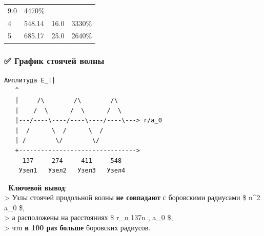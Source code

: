 \documentclass[11pt]{article}
\begin{document}
\begin{longtable}[]{@{}llll@{}}
\begin{minipage}[t]{0.29\columnwidth}
9.0\strut
\end{minipage} & \begin{minipage}[t]{0.22\columnwidth}\raggedright\strut
4470\%\strut
\end{minipage}\tabularnewline
\begin{minipage}[t]{0.07\columnwidth}\raggedright\strut
4\strut
\end{minipage} & \begin{minipage}[t]{0.31\columnwidth}\raggedright\strut
548.14\strut
\end{minipage} & \begin{minipage}[t]{0.29\columnwidth}\raggedright\strut
16.0\strut
\end{minipage} & \begin{minipage}[t]{0.22\columnwidth}\raggedright\strut
3330\%\strut
\end{minipage}\tabularnewline
\begin{minipage}[t]{0.07\columnwidth}\raggedright\strut
5\strut
\end{minipage} & \begin{minipage}[t]{0.31\columnwidth}\raggedright\strut
685.17\strut
\end{minipage} & \begin{minipage}[t]{0.29\columnwidth}\raggedright\strut
25.0\strut
\end{minipage} & \begin{minipage}[t]{0.22\columnwidth}\raggedright\strut
2640\%\strut
\end{minipage}\tabularnewline
\bottomrule
\end{longtable}

\subsubsection{✅ График стоячей
волны}\label{ux433ux440ux430ux444ux438ux43a-ux441ux442ux43eux44fux447ux435ux439-ux432ux43eux43bux43dux44b}

\begin{verbatim}
Амплитуда E_||
   ^
   |     /\        /\        /\
   |    /  \      /  \      /  \
   |---/----\----/----\----/----\---> r/a_0
   |  /      \  /      \  /
   | /        \/        \/
   +-------------------------------->
     137     274     411     548
    Узел1   Узел2   Узел3   Узел4
\end{verbatim}

📌 \textbf{Ключевой вывод}:\\
\textgreater{} Узлы стоячей продольной волны \textbf{не совпадают} с
боровскими радиусами \$ n\^{}2 a\_0 \$,\\
\textgreater{} а расположены на расстояниях \$ r\_n \approx 137n , a\_0
\$,\\
\textgreater{} что \textbf{в 100 раз больше} боровских радиусов.
\end{document}

